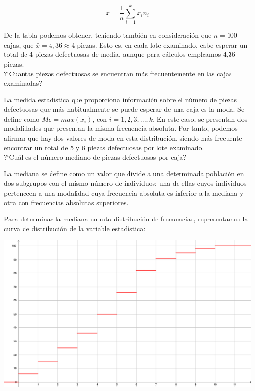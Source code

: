 	$$\bar{x} = \frac{1}{n} \sum_{i=1}^{k}x_{i} n_{i}$$

De la tabla podemos obtener, teniendo también en consideración que $n=100$ cajas, que $\bar{x} = 4,36 \approx 4$ piezas. Esto es, en cada lote examinado, cabe esperar un total de 4 piezas defectuosas de media, aunque para cálculos empleamos 4,36 piezas. \\


\subproblem 
?`Cuantas piezas defectuosas se encuentran m{\'a}s frecuentemente en las
cajas examinadas?

La medida estadística que proporciona información sobre el número de piezas defectuosas que más habitualmente se puede esperar de una caja es la moda. Se define como $Mo = max(x_{i})$, con $i=1,2,3,...,k$. En este caso, se presentan dos modalidades que presentan la misma frecuencia absoluta. Por tanto, podemos afirmar que hay dos valores de moda en esta distribución, siendo más frecuente encontrar un total de 5 y 6 piezas defectuosas por lote examinado. \\

\subproblem
?`Cu{\'a}l es el n{\'u}mero mediano de piezas defectuosas por caja?

La mediana se define como un valor que divide a una determinada población en dos subgrupos con el mismo número de individuos: una de ellas cuyos individuos pertenecen a una modalidad cuya frecuencia absoluta es inferior a la mediana y otra con frecuencias absolutas superiores.

Para determinar la mediana en esta distribución de frecuencias, representamos la curva de distribución de la variable estadística: 

\begin{center}
	\includegraphics[scale=.35]{ejercicio-4-grafica.pdf}
\end{center}

